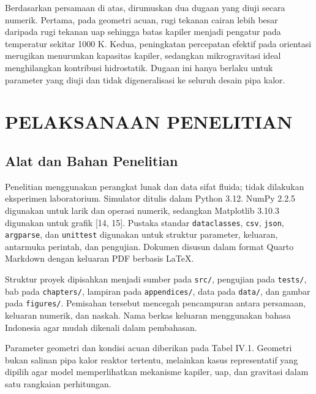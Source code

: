 \documentclass[
  12pt,a4paper,oneside]{report}
\begin{document}
Berdasarkan persamaan di atas, dirumuskan dua dugaan yang diuji secara
numerik. Pertama, pada geometri acuan, rugi tekanan cairan lebih besar
daripada rugi tekanan uap sehingga batas kapiler menjadi pengatur pada
temperatur sekitar 1000 K. Kedua, peningkatan percepatan efektif pada
orientasi merugikan menurunkan kapasitas kapiler, sedangkan
mikrogravitasi ideal menghilangkan kontribusi hidrostatik. Dugaan ini
hanya berlaku untuk parameter yang diuji dan tidak digeneralisasi ke
seluruh desain pipa kalor.

\hypertarget{pelaksanaan-penelitian}{%
\chapter{PELAKSANAAN PENELITIAN}\label{pelaksanaan-penelitian}}

\hypertarget{alat-dan-bahan-penelitian}{%
\section{Alat dan Bahan Penelitian}\label{alat-dan-bahan-penelitian}}

Penelitian menggunakan perangkat lunak dan data sifat fluida; tidak
dilakukan eksperimen laboratorium. Simulator ditulis dalam Python 3.12.
NumPy 2.2.5 digunakan untuk larik dan operasi numerik, sedangkan
Matplotlib 3.10.3 digunakan untuk grafik {[}14, 15{]}. Pustaka standar
\texttt{dataclasses}, \texttt{csv}, \texttt{json}, \texttt{argparse},
dan \texttt{unittest} digunakan untuk struktur parameter, keluaran,
antarmuka perintah, dan pengujian. Dokumen disusun dalam format Quarto
Markdown dengan keluaran PDF berbasis LaTeX.

Struktur proyek dipisahkan menjadi sumber pada \texttt{src/}, pengujian
pada \texttt{tests/}, bab pada \texttt{chapters/}, lampiran pada
\texttt{appendices/}, data pada \texttt{data/}, dan gambar pada
\texttt{figures/}. Pemisahan tersebut mencegah pencampuran antara
persamaan, keluaran numerik, dan naskah. Nama berkas keluaran
menggunakan bahasa Indonesia agar mudah dikenali dalam pembahasan.

Parameter geometri dan kondisi acuan diberikan pada Tabel IV.1. Geometri
bukan salinan pipa kalor reaktor tertentu, melainkan kasus representatif
yang dipilih agar model memperlihatkan mekanisme kapiler, uap, dan
gravitasi dalam satu rangkaian perhitungan.
\end{document}
